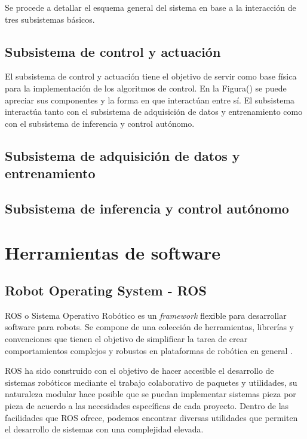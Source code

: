     Se procede a detallar el esquema general del sistema en base a la interacción de tres subsistemas básicos. 

    \subsection{Subsistema de control y actuación} \label{sec:esqcontrol}
    El subsistema de control y actuación tiene el objetivo de servir como base física para la implementación de los algoritmos 
    de control. En la Figura() se puede apreciar sus componentes y la forma en que interactúan entre sí. El subsistema 
    interactúa tanto con el subsistema de adquisición de datos y entrenamiento como con el subsistema de inferencia y control 
    autónomo. 
    
    \subsection{Subsistema de adquisición de datos y entrenamiento}

    \subsection{Subsistema de inferencia y control autónomo}
    

\section{Herramientas de software}
    \subsection{Robot Operating System - ROS}
    ROS o Sistema Operativo Robótico es un \textit{framework} flexible para desarrollar software para robots. Se compone 
    de una colección de herramientas, librerías y convenciones que tienen el objetivo de simplificar la tarea de crear 
    comportamientos complejos y robustos en plataformas de robótica en general \cite{ros}.

    ROS ha sido construido con el objetivo de hacer accesible el desarrollo de sistemas robóticos mediante el trabajo 
    colaborativo de paquetes y utilidades, su naturaleza modular hace posible que se puedan implementar sistemas pieza 
    por pieza de acuerdo a las necesidades específicas de cada proyecto. Dentro de las facilidades que ROS ofrece, podemos 
    encontrar diversas utilidades que permiten el desarrollo de sistemas con una complejidad elevada.

